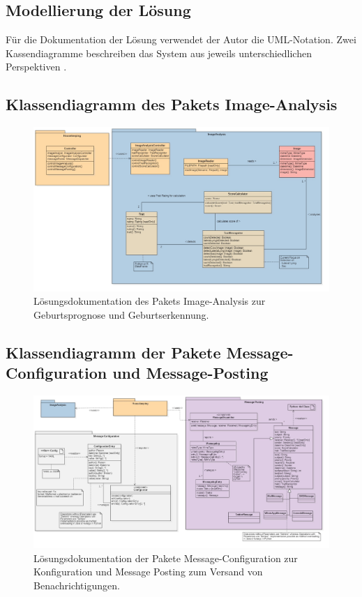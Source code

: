 \begin{landscape}

\section{Modellierung der Lösung}
Für die Dokumentation der Lösung verwendet der Autor die UML-Notation. Zwei Kassendiagramme beschreiben das System aus jeweils unterschiedlichen Perspektiven \cite{Uml-modellierung2012}. 

\subsection{Klassendiagramm des Pakets Image-Analysis }
\begin{figure}[H]
	\center
	\includegraphics[scale=0.45]{Grafiken/modelle/solution-imageanalysis.jpg}
	\caption{Lösungsdokumentation des Pakets Image-Analysis zur Geburtsprognose und Geburtserkennung.} 
	\label{fig: Lösungsdokumentation des Pakets Image-Analysis zur Geburtsprognose und Geburtserkennung.}
\end{figure}

\subsection{Klassendiagramm der Pakete Message-Configuration und Message-Posting}
\begin{figure}[H]
	\center
	\includegraphics[scale=0.43]{Grafiken/modelle/solution-messaging.jpg}
	\caption{Lösungsdokumentation der Pakete Message-Configuration zur Konfiguration und Message Posting zum Versand von Benachrichtigungen.} 
	\label{fig: Lösungsdokumentation der Pakete Message-Configuration zur Konfiguration und Message Posting zum Versand von Benachrichtigungen.}
\end{figure}


\end{landscape}
